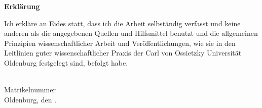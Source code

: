 \newpage
\thispagestyle{empty}
\vspace{6.8cm}
\begin{center}
	\begin{Large}
		\textbf{Erklärung}
	\end{Large}
\end{center}

\noindent
Ich erkläre an Eides statt, dass ich die Arbeit selbständig verfasst
und keine anderen als die angegebenen Quellen und Hilfsmittel benutzt und die allgemeinen Prinzipien wissenschaftlicher Arbeit und Veröffentlichungen, wie sie in den Leitlinien guter wissenschaftlicher Praxis der Carl von Ossietzky Universität Oldenburg festgelegt sind, befolgt habe.

\vspace{3cm}
\noindent
\Name\\
Matrikelnummer \MatrNr\\
Oldenburg, den \the\day. \MONTH\ \the\year{}